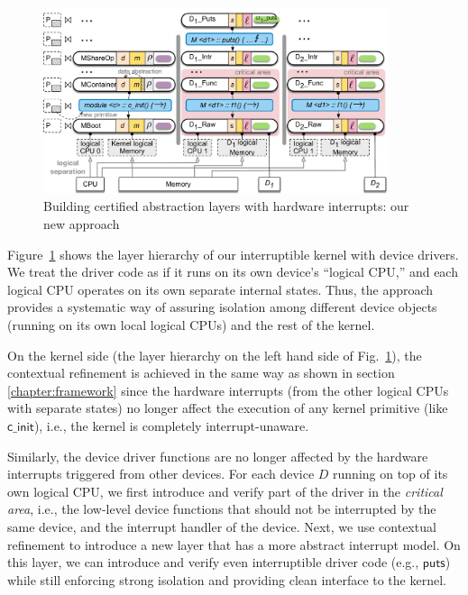 \begin{figure}
	\begin{center}
	  \includegraphics[width=0.90\textwidth]{figs/layer_new}
	\end{center}
	\caption{Building certified abstraction layers with hardware interrupts: our new approach}
	\label{fig:layer_new}
\end{figure}


Figure~\ref{fig:layer_new} shows the layer hierarchy of our
interruptible kernel with device drivers.  We treat the driver code as
if it runs on its own device's ``logical CPU,'' and each logical CPU
operates on its own separate internal states. Thus, the approach
provides a systematic way of assuring isolation among different device
objects (running on its own local logical CPUs) and the rest of the kernel.

On the kernel side (the layer hierarchy on the left hand side of
Fig.~\ref{fig:layer_new}), the contextual refinement is achieved in
the same way as shown in section \ref{chapter:framework} since the hardware interrupts (from
the other logical CPUs with separate states) no longer affect the
execution of any kernel primitive (like $\textsf{c\_init}$), i.e., the
kernel is completely interrupt-unaware.

Similarly, the device driver functions are no longer affected by the
hardware interrupts triggered from other devices.  For each device $D$
running on top of its own logical CPU, we first introduce and verify
part of the driver in the {\em critical area}, i.e., the low-level
device functions that should not be interrupted by the same device,
and the interrupt handler of the device.  Next, we use contextual
refinement to introduce a new layer that has a more abstract interrupt
model. On this layer, we can introduce and verify even interruptible
driver code (e.g., $\textsf{puts}$) while still enforcing strong
isolation and providing clean interface to the kernel.

